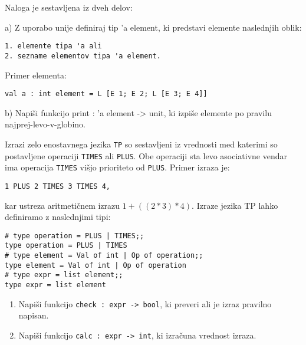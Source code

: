 \begin{ex}Naloga je sestavljena iz dveh delov:

a) Z uporabo unije definiraj tip 'a element, ki predstavi elemente naslednjih oblik:
\begin{lstlisting}
1. elemente tipa 'a ali
2. sezname elementov tipa 'a element.
\end{lstlisting}
    Primer elementa: 
\begin{lstlisting}
val a : int element = L [E 1; E 2; L [E 3; E 4]]
\end{lstlisting}

b) Napi\v si funkcijo print : 'a element -> unit, ki izpi\v se elemente po pravilu                          
    najprej-levo-v-globino.
\end{ex} 





\begin{ex}
   Izrazi zelo enostavnega jezika \lstinline{TP} so sestavljeni iz
   vrednosti med katerimi so postavljene operaciji \lstinline{TIMES} ali
   \lstinline{PLUS}. Obe operaciji sta levo asociativne vendar ima
   operacija \lstinline{TIMES} vi\v sjo prioriteto od
   \lstinline{PLUS}. Primer izraza je:

\begin{lstlisting}
1 PLUS 2 TIMES 3 TIMES 4,
\end{lstlisting}

   kar ustreza aritmeti\v cnem izrazu $1 + ((2 * 3) * 4)$. Izraze jezika
   TP lahko definiramo z naslednjimi tipi:
 
   \begin{lstlisting}
# type operation = PLUS | TIMES;; 
type operation = PLUS | TIMES 
# type element = Val of int | Op of operation;; 
type element = Val of int | Op of operation
# type expr = list element;;
type expr = list element
\end{lstlisting}

   \begin{enumerate}[label=(\roman*)]
   \item Napi\v si funkcijo \lstinline{check : expr -> bool}, ki preveri
     ali je izraz pravilno napisan.

   \item Napi\v si funkcijo \lstinline{calc : expr -> int}, ki izra\v
     cuna vrednost izraza.
   \end{enumerate}
\end{ex}




